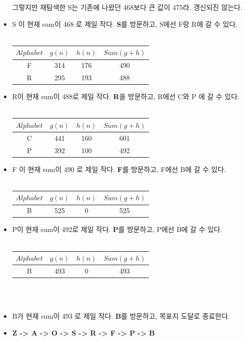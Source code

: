\documentclass[a4paper]{article}
\begin{document}
\begin{itemize}
\begin{tabular}{@{}cccc@{}}
        \bottomrule
        \end{tabular} \\~\\
        그렇지만 재탐색한 S는 기존에 나왔던 468보다 큰 값이 475라, 갱신되진 않는다. 
    \item S 이 현재 sum이 468 로 제일 작다. \textbf{S}를 방문하고, S에선 F랑 R에 갈 수 있다. \\~\\
        \begin{tabular}{@{}cccc@{}}
        \toprule
        $Alphabet$ & $g(n)$ & $h(n)$ & $Sum(g+h)$\\ \midrule
        F & 314 & 176 & 490 \\ 
        R & 295 & 193 & 488 \\ 
        \bottomrule
        \end{tabular} 
    \item R이 현재 sum이 488로 제일 작다. \textbf{R}을 방문하고, R에선 C와 P 에 갈 수 있다. \\~\\
        \begin{tabular}{@{}cccc@{}}
        \toprule
        $Alphabet$ & $g(n)$ & $h(n)$ & $Sum(g+h)$\\ \midrule
        C & 441 & 160 & 601 \\
        P & 392 & 100 & 492 \\
        \bottomrule
        \end{tabular}
    \item F 이 현재 sum이 490 로 제일 작다. \textbf{F}를 방문하고, F에선 B에 갈 수 있다. \\~\\
        \begin{tabular}{@{}cccc@{}}
        \toprule
        $Alphabet$ & $g(n)$ & $h(n)$ & $Sum(g+h)$\\ \midrule
        B & 525 & 0 & 525 \\
        \bottomrule
        \end{tabular}
    \item P이 현재 sum이 492로 제일 작다. \textbf{P}를 방문하고, P에선 B에 갈 수 있다.  \\~\\
        \begin{tabular}{@{}cccc@{}}
        \toprule
        $Alphabet$ & $g(n)$ & $h(n)$ & $Sum(g+h)$\\ \midrule
        B & 493 & 0 & 493 \\
        \bottomrule
        \end{tabular} \\~\\ 
    \item B가 현재 sum이 493 로 제일 작다. \textbf{B}를 방문하고, 목표지 도달로 종료한다. 
    \item \textbf{Z -> A -> O -> S -> R -> F -> P -> B}
\end{itemize} 
\end{document}
